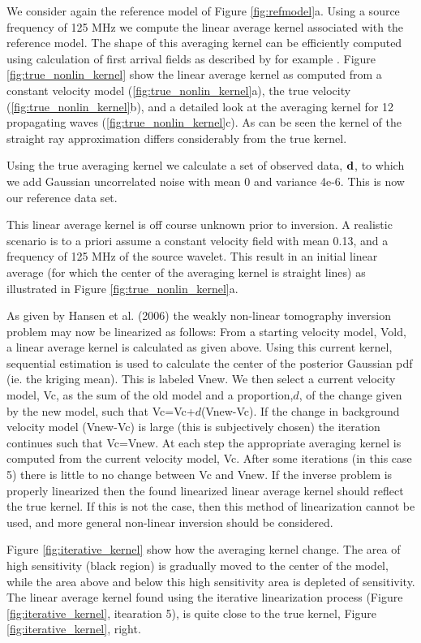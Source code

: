 \documentclass[12t]{article}
\begin{document}
We consider again the reference model of Figure  \ref{fig:refmodel}a. Using a source frequency of 125 MHz we compute the linear average kernel associated with the reference model. 
The shape of this averaging kernel can be efficiently computed using calculation of first arrival fields as described by for example \cite{Munk}. 
Figure \ref{fig:true_nonlin_kernel} show the linear average kernel as computed from a 
constant velocity model (\ref{fig:true_nonlin_kernel}a), 
the true velocity (\ref{fig:true_nonlin_kernel}b), and a detailed look at the averaging kernel for 12 propagating waves (\ref{fig:true_nonlin_kernel}c).  As can be seen the kernel of the straight ray approximation differs considerably from the true kernel.

Using the true averaging kernel we calculate a set of observed data, ${\bf d}$, to which we add Gaussian uncorrelated noise with mean 0 and variance 4e-6. This is now our reference data set.

This linear average kernel is off course unknown prior to inversion. A realistic scenario is to a priori assume a constant velocity field with mean 0.13, and a frequency of 125 MHz of the source wavelet. This result in an initial linear average (for which the center of the averaging kernel is straight lines) as illustrated in Figure \ref{fig:true_nonlin_kernel}a.

As given by Hansen et al. (2006) the weakly non-linear tomography inversion problem may now be linearized as follows: 
From a starting velocity model, Vold, a linear average kernel is calculated as given above. Using this current kernel, sequential estimation is used to calculate the center of the posterior Gaussian pdf (ie. the kriging mean). This is labeled Vnew. We then select a current velocity model, Vc, as the sum of the old model and a proportion,$d$,  of the change given by the new model, such that Vc=Vc+$d$(Vnew-Vc). If the change in background velocity model (Vnew-Vc) is large (this is subjectively chosen) the iteration continues such that Vc=Vnew.
At each step the appropriate averaging kernel is computed from the current velocity model, Vc. After some iterations (in this case 5) there is little to no change between Vc and Vnew. 
If the inverse problem is properly linearized then the found linearized linear average kernel should reflect the true kernel. If this is not the case, then this method of linearization cannot be used, and more general non-linear inversion should be considered.


Figure \ref{fig:iterative_kernel} show how the averaging kernel change. The area of high sensitivity (black region) is gradually moved to the center of the model, while the area above and below this high sensitivity area is depleted of sensitivity.
The linear average kernel found using the iterative linearization process (Figure \ref{fig:iterative_kernel}, itearation 5), is quite close to the true kernel, Figure \ref{fig:iterative_kernel}, right.
\end{document}
